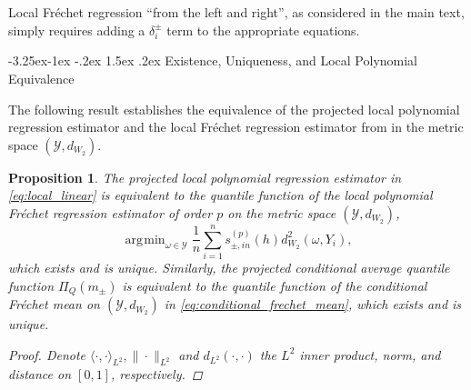 \documentclass[12pt]{article}
\makeatletter
\renewcommand\subsection{\@startsection{subsection}{2}{\z@}%
  {-3.25ex\@plus -1ex \@minus -.2ex}%
  {1.5ex \@plus .2ex}%
  {\itshape\large\center}} %
\newtheorem{proposition}{Proposition}
\DeclareMathOperator*{\argmin}{\arg\!\min}
\newcommand{\sumn}{\sum_{i=1}^n}
\makeatother
\begin{document}
Local Fr\'echet regression ``from the left and right'', as considered in the main text, simply requires adding a $\delta_i^\pm$ term to the appropriate equations. 

\subsection{Existence, Uniqueness, and Local Polynomial Equivalence}


The following result establishes the equivalence of the projected local polynomial regression estimator and the local Fr\'echet regression estimator from \citet{petersen2019frechet} in the metric space $(\mathcal{Y}, d_{W_2})$. 


\begin{proposition} \label{prop:wasserstein}
The projected local polynomial regression estimator in \eqref{eq:local_linear} is equivalent to the quantile function of the local polynomial Fr\'echet regression estimator of order $p$ on the metric space $(\mathcal{Y}, d_{W_2})$,
\[
\argmin_{\omega \in \mathcal{Y}} \frac1n \sumn s_{\pm,in}^{(p)}(h) d^2_{W_2}(\omega, Y_i), 
\]
which exists and is unique.
Similarly, the projected conditional average quantile function $\Pi_Q(m_\pm)$ is equivalent to the quantile function of the conditional Fr\'echet mean on $(\mathcal{Y}, d_{W_2})$ in \eqref{eq:conditional_frechet_mean}, which exists and is unique. 
\begin{proof}
 Denote $\langle\cdot, \cdot\rangle_{L^2},\|\cdot\|_{L^2}$ and $d_{L^2}(\cdot, \cdot)$ the $L^2$ inner product, norm, and distance on $[0,1]$, respectively.


\end{proof}
\end{proposition}
\end{document}
